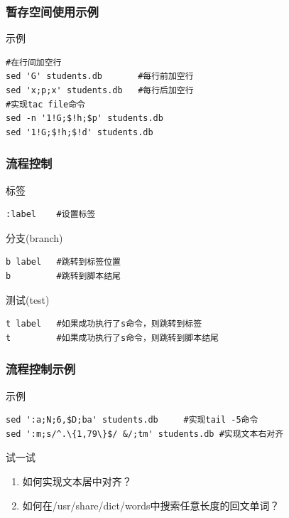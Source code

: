 \documentclass[xcolor=svgnames,presentation]{beamer}
\begin{document}
\begin{frame}[fragile]
\frametitle{暂存空间使用示例}
\label{sec-2-1-16}
\begin{exampleblock}{示例}
\label{sec-2-1-16-1}


\begin{verbatim}
#在行间加空行
sed 'G' students.db       #每行前加空行
sed 'x;p;x' students.db   #每行后加空行
#实现tac file命令
sed -n '1!G;$!h;$p' students.db
sed '1!G;$!h;$!d' students.db
\end{verbatim}
\end{exampleblock}
\end{frame}
\begin{frame}[fragile]
\frametitle{流程控制}
\label{sec-2-1-17}
\begin{exampleblock}{标签}
\label{sec-2-1-17-1}


\begin{verbatim}
:label    #设置标签
\end{verbatim}
\end{exampleblock}
\begin{block}{分支(branch)}
\label{sec-2-1-17-2}


\begin{verbatim}
b label   #跳转到标签位置
b         #跳转到脚本结尾
\end{verbatim}
\end{block}
\begin{exampleblock}{测试(test)}
\label{sec-2-1-17-3}


\begin{verbatim}
t label   #如果成功执行了s命令，则跳转到标签
t         #如果成功执行了s命令，则跳转到脚本结尾
\end{verbatim}
\end{exampleblock}
\end{frame}
\begin{frame}[fragile]
\frametitle{流程控制示例}
\label{sec-2-1-18}
\begin{exampleblock}{示例}
\label{sec-2-1-18-1}


\begin{verbatim}
sed ':a;N;6,$D;ba' students.db     #实现tail -5命令
sed ':m;s/^.\{1,79\}$/ &/;tm' students.db #实现文本右对齐
\end{verbatim}
\end{exampleblock}
\begin{block}{试一试}
\label{sec-2-1-18-2}

\begin{enumerate}
\item 如何实现文本居中对齐？
\item 如何在/usr/share/dict/words中搜索任意长度的回文单词？
\end{enumerate}
\end{block}
\end{frame}
\end{document}
